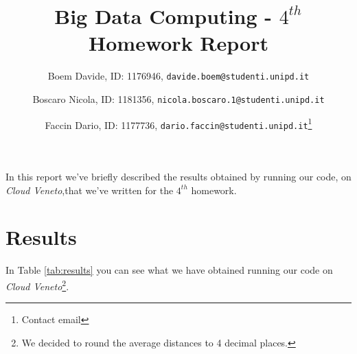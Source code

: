 \documentclass[10pt]{article}
\begin{document}
 
 
 
\title{Big Data Computing - $4^{th}$ Homework Report}
\author{Boem Davide, ID: 1176946, \texttt{davide.boem@studenti.unipd.it} \and Boscaro Nicola, ID: 1181356, \texttt{nicola.boscaro.1@studenti.unipd.it} \and Faccin Dario, ID: 1177736, \texttt{dario.faccin@studenti.unipd.it}\footnote{Contact email}}
\date{}
 
\maketitle


In this report we've briefly described the results obtained by running our code, on \textit{Cloud Veneto},that we've written for the $4^{th}$ homework.

\section{Results}

In Table \ref{tab:results} you can see what we have obtained running our code on \textit{Cloud Veneto}\footnote{We decided to round the average distances to 4 decimal places.}.
\end{document}
